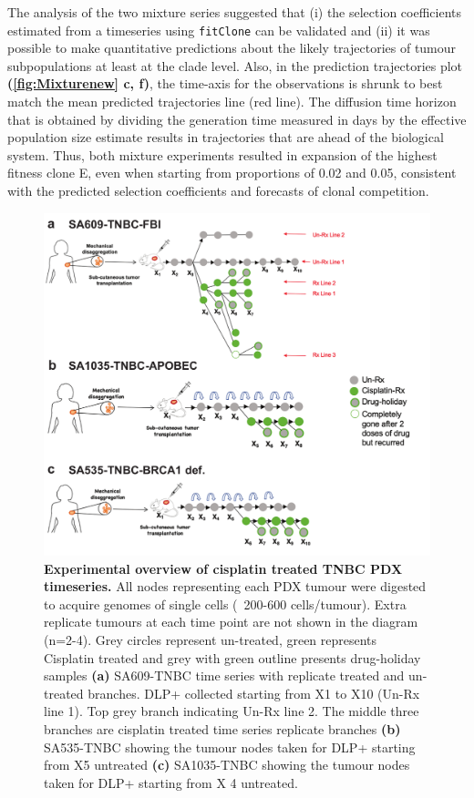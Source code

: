 The analysis of the two mixture series suggested that (i) the selection coefficients estimated from a timeseries using \texttt{fitClone} can be validated and (ii) it was possible to make quantitative predictions about the likely trajectories of tumour subpopulations at least at the clade level. Also, in the prediction trajectories plot \textbf{(\autoref{fig:Mixturenew} c, f)}, the time-axis for the observations is shrunk to best match the mean predicted trajectories line (red line). The diffusion time horizon that is obtained by dividing the generation time measured in days by the effective population size estimate results in trajectories that are ahead of the biological system.
Thus, both mixture experiments resulted in expansion of the highest fitness clone E, even when starting from proportions of 0.02 and 0.05, consistent with the predicted selection coefficients and forecasts of clonal competition.

\begin{figure}
\centering
\includegraphics[width=\textwidth]{Figures/chap4/treatedtimeseriesgreen.pdf}

\caption[Experimental overview of TNBC PDX treated time series]
	{\small
	\textbf{Experimental overview of cisplatin treated TNBC PDX timeseries.}
	      All nodes representing each PDX tumour were digested to acquire genomes of single cells (~200-600 cells/tumour). Extra replicate tumours at each time point are not shown in the diagram (n=2-4). Grey circles represent un-treated, green represents Cisplatin treated and grey with green outline presents drug-holiday samples \textbf{(a)} SA609-TNBC time series with replicate treated and un-treated branches. DLP+ collected starting from X1 to X10 (Un-Rx line 1). Top grey branch indicating Un-Rx line 2. The middle three branches are cisplatin treated time series replicate branches \textbf{(b)} SA535-TNBC showing the tumour nodes taken for DLP+ starting from X5 untreated \textbf{(c)} SA1035-TNBC showing the tumour nodes taken for DLP+ starting from X 4 untreated.}
	
	\label{fig:treatedtimeseriesgreen}
\end{figure}

